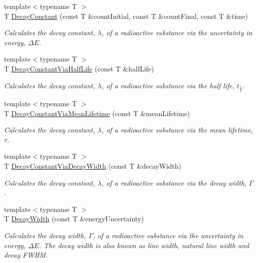 \begin{DoxyCompactItemize}
{\footnotesize template$<$typename T $>$ }\\T \mbox{\hyperlink{group___e_g_x_phys-_decay_constant_ga904edce5aad441b4a0873b3b1a83c7f2}{Decay\+Constant}} (const T \&count\+Initial, const T \&count\+Final, const T \&time)
\begin{DoxyCompactList}\small\item\em Calculates the decay constant, $\lambda$, of a radioactive substance via the uncertainty in energy, $\Delta E$. \end{DoxyCompactList}\item 
{\footnotesize template$<$typename T $>$ }\\T \mbox{\hyperlink{group___e_g_x_phys-_decay_constant_ga89c04a655d9e24f976399cc8f173b7aa}{Decay\+Constant\+Via\+Half\+Life}} (const T \&half\+Life)
\begin{DoxyCompactList}\small\item\em Calculates the decay constant, $\lambda$, of a radioactive substance via the half life, $t_{\frac{1}{2}}$. \end{DoxyCompactList}\item 
{\footnotesize template$<$typename T $>$ }\\T \mbox{\hyperlink{group___e_g_x_phys-_decay_constant_ga260cf6dc4f926269ea8966c19dfd269f}{Decay\+Constant\+Via\+Mean\+Lifetime}} (const T \&mean\+Lifetime)
\begin{DoxyCompactList}\small\item\em Calculates the decay constant, $\lambda$, of a radioactive substance via the mean lifetime, $\tau$. \end{DoxyCompactList}\item 
{\footnotesize template$<$typename T $>$ }\\T \mbox{\hyperlink{group___e_g_x_phys-_decay_constant_gac0dc5d8a75657eaa2e939dd243fe4ba8}{Decay\+Constant\+Via\+Decay\+Width}} (const T \&decay\+Width)
\begin{DoxyCompactList}\small\item\em Calculates the decay constant, $\lambda$, of a radioactive substance via the decay width, $\Gamma$. \end{DoxyCompactList}\item 
{\footnotesize template$<$typename T $>$ }\\T \mbox{\hyperlink{group___e_g_x_phys-_decay_width_gae232ec8bb39710131be898c057a25620}{Decay\+Width}} (const T \&energy\+Uncertainty)
\begin{DoxyCompactList}\small\item\em Calculates the decay width, $\Gamma$, of a radioactive substance via the uncertainty in energy, $\Delta E$. The decay width is also known as line width, natural line width and decay F\+W\+HM. \end{DoxyCompactList}\item 

\end{DoxyCompactItemize}
